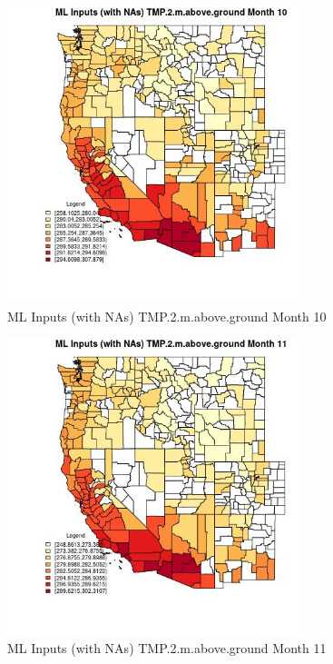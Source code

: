\begin{figure} 
\centering  
\includegraphics[width=0.77\textwidth]{Code_Outputs/Report_ML_input_PM25_Step4_part_f_de_duplicated_aves_prioritize_24hr_obswNAs_CountyTMP2mabovegroundmedianMonth10.jpg} 
\caption{\label{fig:Report_ML_input_PM25_Step4_part_f_de_duplicated_aves_prioritize_24hr_obswNAsCountyTMP2mabovegroundmedianMonth10}ML Inputs (with NAs) TMP.2.m.above.ground Month 10} 
\end{figure} 
 

\begin{figure} 
\centering  
\includegraphics[width=0.77\textwidth]{Code_Outputs/Report_ML_input_PM25_Step4_part_f_de_duplicated_aves_prioritize_24hr_obswNAs_CountyTMP2mabovegroundmedianMonth11.jpg} 
\caption{\label{fig:Report_ML_input_PM25_Step4_part_f_de_duplicated_aves_prioritize_24hr_obswNAsCountyTMP2mabovegroundmedianMonth11}ML Inputs (with NAs) TMP.2.m.above.ground Month 11} 
\end{figure} 
 

